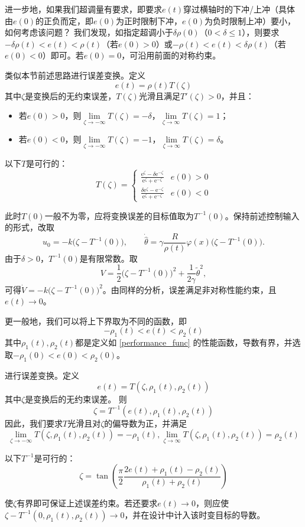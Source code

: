 进一步地，如果我们超调量有要求，即要求$e(t)$穿过横轴时的下冲/上冲（具体由$e(0)$的正负而定，即$e(0)$为正时限制下冲，$e(0)$为负时限制上冲）要小，如何考虑该问题？
我们发现，如指定超调小于$\delta\rho(0)$（$0<\delta\le 1$），则要求$-\delta\rho(t)<e(t)<\rho(t)$（若$e(0)>0$）或$-\rho(t)<e(t)<\delta\rho(t)$（若$e(0)<0$）即可。若$e(0)=0$，可沿用前面的对称约束。

类似本节前述思路进行误差变换。定义\[e(t)=\rho(t)T(\zeta)\]
其中$\zeta$是变换后的无约束误差，$T(\zeta)$光滑且满足$T'(\zeta)>0$，并且：
\begin{itemize}[leftmargin=1em]
    \item 若$e(0)>0$，则$\lim\limits_{\zeta\to-\infty}T(\zeta)=-\delta$，$\lim\limits_{\zeta\to\infty}T(\zeta)=1$；
    \item 若$e(0)<0$，则$\lim\limits_{\zeta\to-\infty}T(\zeta)=-1$，$\lim\limits_{\zeta\to\infty}T(\zeta)=\delta$。
\end{itemize}
\begin{example}
    以下$T$是可行的：
    \[T(\zeta) = \begin{cases}
        \frac{\mathrm{e}^\zeta-\delta \mathrm{e}^{-\zeta}}{\mathrm{e}^\zeta+ \mathrm{e}^{-\zeta}}&e(0)>0\\
        \frac{\delta\mathrm{e}^\zeta- \mathrm{e}^{-\zeta}}{\mathrm{e}^\zeta+ \mathrm{e}^{-\zeta}}&e(0)<0
    \end{cases}\]
\end{example}
此时$T(0)$一般不为零，应将变换误差的目标值取为$T^{-1}(0)$。保持前述控制输入的形式，改取
\[
    u_0=-k\bigl(\zeta-T^{-1}(0)\bigr),\qquad
    \dot{\hat\theta}=\gamma\frac{R}{\rho(t)}\varphi(x)\bigl(\zeta-T^{-1}(0)\bigr).
\]
由于$\delta>0$，$T^{-1}(0)$是有限常数。取
\[
    V=\frac12\bigl(\zeta-T^{-1}(0)\bigr)^2+\frac{1}{2\gamma}\tilde\theta^2,
\]
可得$\dot V=-k\bigl(\zeta-T^{-1}(0)\bigr)^2$。由同样的分析，误差满足非对称性能约束，且$e(t)\to0$。

更一般地，我们可以将上下界取为不同的函数，即
\[-\rho_1(t)<e(t)<\rho_2(t)\]
其中$\rho_1(t),\rho_2(t)$都是定义如 \ref{performance_func} 的性能函数，导数有界，并选取$-\rho_1(0)<e(0)<\rho_2(0)$。

进行误差变换。定义\[e(t)=T(\zeta,\rho_1(t),\rho_2(t))\]
其中$\zeta$是变换后的无约束误差。
则\[\zeta = T^{-1}(e(t),\rho_1(t),\rho_2(t))\]
因此，我们要求$T$光滑且对$\zeta$的偏导数为正，并满足\[\lim\limits_{\zeta\to-\infty}T(\zeta,\rho_1(t),\rho_2(t))=-\rho_1(t),\lim\limits_{\zeta\to\infty}T(\zeta,\rho_1(t),\rho_2(t))=\rho_2(t)\]
\begin{example}
    以下$T^{-1}$是可行的：
    \[\zeta = \tan\left(\frac{\pi}{2}\frac{2e(t)+\rho_1(t)-\rho_2(t)}{\rho_1(t)+\rho_2(t)}\right)\]
\end{example}

使$\zeta$有界即可保证上述误差约束。若还要求$e(t)\to0$，则应使$\zeta-T^{-1}(0,\rho_1(t),\rho_2(t))\to0$，并在设计中计入该时变目标的导数。
